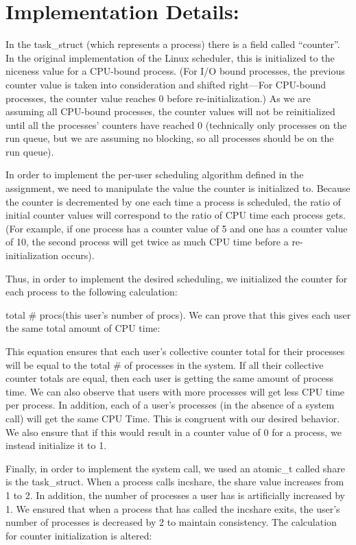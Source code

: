 \documentclass[10pt]{article}
\begin{document}
\section{Implementation Details:}

In the task\_struct (which represents a process) there is a field called ``counter''. In the original implementation of the Linux scheduler, this is initialized to the niceness value for a CPU-bound process. (For I/O bound processes, the previous counter value is taken into consideration and shifted right—For CPU-bound processes, the counter value reaches 0 before re-initialization.) As we are assuming all CPU-bound processes, the counter values will not be reinitialized until all the processes' counters have reached 0 (technically only processes on the run queue, but we are assuming no blocking, so all processes should be on the run queue).

In order to implement the per-user scheduling algorithm defined in the assignment, we need to manipulate the value the counter is initialized to. Because the counter is decremented by one each time a process is scheduled, the ratio of initial counter values will correspond to the ratio of CPU time each process gets. (For example, if one process has a counter value of 5 and one has a counter value of 10, the second process will get twice as much CPU time before a re-initialization occurs).

Thus, in order to implement the desired scheduling, we initialized the counter for each process to the following calculation:

total \# procs\/(this user's number of procs). We can prove that this gives each user the same total amount of CPU time:

This equation ensures that each user's collective counter total for their processes will be equal to the total # of processes in the system. If all their collective counter totals are equal, then each user is getting the same amount of process time. We can also observe that users with more processes will get less CPU time per process. In addition, each of a user's processes (in the absence of a system call) will get the same CPU Time. This is congruent with our desired behavior. We also ensure that if this would result in a counter value of 0 for a process, we instead initialize it to 1.

Finally, in order to implement the system call, we used an atomic\_t called share is the task\_struct. When a process calls incshare, the share value increases from 1 to 2. In addition, the number of processes a user has is artificially increased by 1. We ensured that when a process that has called the incshare exits, the user's number of processes is decreased by 2 to maintain consistency. The calculation for counter initialization is altered:
\end{document}
